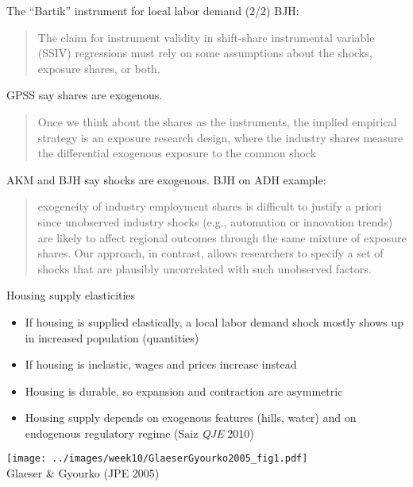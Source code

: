 \documentclass[11pt,notes=hide,aspectratio=169]{beamer}
\begin{document}
\begin{frame}{The ``Bartik'' instrument for local labor demand (2/2)}
BJH:
\begin{quote}{\small
The claim for instrument validity in shift-share instrumental variable (SSIV) regressions must rely on some assumptions about the shocks, exposure shares, or both.\par
\par}\end{quote}
GPSS say shares are exogenous.
\begin{quote}{\small
Once we think about the shares as the instruments, the implied empirical strategy is an exposure research design, where the industry shares measure the differential exogenous exposure to the common shock
\par}\end{quote}
AKM and BJH say shocks are exogenous.
BJH on ADH example:
\begin{quote}{\small
exogeneity of industry employment shares is difficult to justify a priori since unobserved industry shocks (e.g., automation or innovation trends) are likely to affect regional outcomes through the same mixture of exposure shares. Our approach, in contrast, allows researchers to specify a set of shocks that are plausibly uncorrelated with such unobserved factors.\par
\par}\end{quote}
\end{frame}
\begin{frame}{Housing supply elasticities}
\begin{itemize}
	\item If housing is supplied elastically, a local labor demand shock mostly shows up in increased population (quantities)
	\item If housing is inelastic, wages and prices increase instead
	\item Housing is durable, so expansion and contraction are asymmetric
	\item Housing supply depends on exogenous features (hills, water) and on endogenous regulatory regime (Saiz \textit{QJE} 2010)
\end{itemize}
\begin{center}
\texttt{[image: ../images/week10/GlaeserGyourko2005\_fig1.pdf]}\\
\vspace{-2mm}
{\small Glaeser \& Gyourko (JPE 2005)}
\end{center}
\end{frame}
\end{document}
